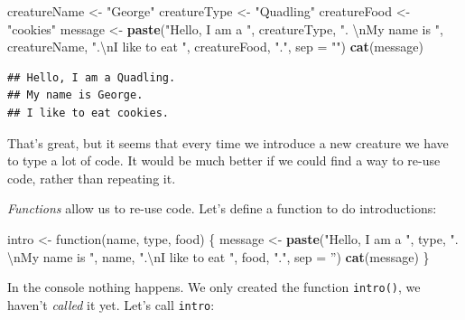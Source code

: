 \documentclass[]{book}
\makeatletter
\newenvironment{Shaded}{\begin{snugshade}}{\end{snugshade}}
\newcommand{\KeywordTok}[1]{\textcolor[rgb]{0.13,0.29,0.53}{\textbf{{#1}}}}
\newcommand{\DataTypeTok}[1]{\textcolor[rgb]{0.13,0.29,0.53}{{#1}}}
\newcommand{\CharTok}[1]{\textcolor[rgb]{0.31,0.60,0.02}{{#1}}}
\newcommand{\StringTok}[1]{\textcolor[rgb]{0.31,0.60,0.02}{{#1}}}
\newcommand{\NormalTok}[1]{{#1}}
\newenvironment{kframe}{%
\medskip{}
\setlength{\fboxsep}{.8em}
 \def\at@end@of@kframe{}%
 \ifinner\ifhmode%
  \def\at@end@of@kframe{\end{minipage}}%
  \begin{minipage}{\columnwidth}%
 \fi\fi%
 \def\FrameCommand##1{\hskip\@totalleftmargin \hskip-\fboxsep
 \colorbox{shadecolor}{##1}\hskip-\fboxsep
     \hskip-\linewidth \hskip-\@totalleftmargin \hskip\columnwidth}%
 \MakeFramed {\advance\hsize-\width
   \@totalleftmargin\z@ \linewidth\hsize
   \@setminipage}}%
 {\par\unskip\endMakeFramed%
 \at@end@of@kframe}
\renewenvironment{Shaded}{\begin{kframe}}{\end{kframe}}
\theoremstyle{definition}
\theoremstyle{definition}
\theoremstyle{remark}
\makeatother
\begin{document}
\begin{Shaded}
\begin{Highlighting}[]
\NormalTok{creatureName <-}\StringTok{ "George"}
\NormalTok{creatureType <-}\StringTok{ "Quadling"}
\NormalTok{creatureFood <-}\StringTok{ "cookies"}
\NormalTok{message <-}\StringTok{ }\KeywordTok{paste}\NormalTok{(}\StringTok{"Hello, I am a "}\NormalTok{,}
                 \NormalTok{creatureType,}
                 \StringTok{".  }\CharTok{\textbackslash{}n}\StringTok{My name is "}\NormalTok{,}
                 \NormalTok{creatureName,}
                 \StringTok{".}\CharTok{\textbackslash{}n}\StringTok{I like to eat "}\NormalTok{,}
                 \NormalTok{creatureFood,}
                 \StringTok{"."}\NormalTok{,}
                 \DataTypeTok{sep =} \StringTok{""}\NormalTok{)}
\KeywordTok{cat}\NormalTok{(message)}
\end{Highlighting}
\end{Shaded}

\begin{verbatim}
## Hello, I am a Quadling.  
## My name is George.
## I like to eat cookies.
\end{verbatim}

That's great, but it seems that every time we introduce a new creature
we have to type a lot of code. It would be much better if we could find
a way to re-use code, rather than repeating it.

\emph{Functions} allow us to re-use code. Let's define a function to do
introductions:

\begin{Shaded}
\begin{Highlighting}[]
\NormalTok{intro <-}\StringTok{ }\NormalTok{function(name, type, food) \{}
  \NormalTok{message <-}\StringTok{ }\KeywordTok{paste}\NormalTok{(}\StringTok{"Hello, I am a "}\NormalTok{,}
                 \NormalTok{type,}
                 \StringTok{".  }\CharTok{\textbackslash{}n}\StringTok{My name is "}\NormalTok{,}
                 \NormalTok{name,}
                 \StringTok{".}\CharTok{\textbackslash{}n}\StringTok{I like to eat "}\NormalTok{,}
                 \NormalTok{food,}
                 \StringTok{"."}\NormalTok{,}
                 \DataTypeTok{sep =} \StringTok{''}\NormalTok{)}
  \KeywordTok{cat}\NormalTok{(message)}
\NormalTok{\}}
\end{Highlighting}
\end{Shaded}

In the console nothing happens. We only created the function
\texttt{intro()}, we haven't \emph{called} it yet. Let's call
\texttt{intro}:
\end{document}
